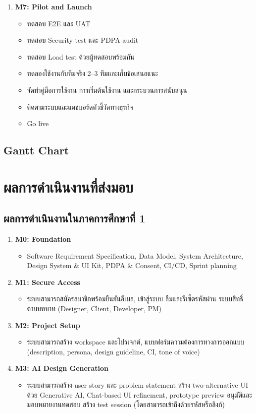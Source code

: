 \begin{enumerate}
  \item \textbf{M7: Pilot and Launch}
    \begin{itemize}
      \item ทดสอบ E2E และ UAT
      \item ทดสอบ Security test และ PDPA audit
      \item ทดสอบ Load test ด้วยผู้ทดสอบพร้อมกัน
      \item ทดลองใช้งานกับทีมจริง 2–3 ทีมและเก็บข้อเสนอแนะ
      \item จัดทำคู่มือการใช้งาน การเริ่มต้นใช้งาน และกระบวนการสนับสนุน
      \item ติดตามระบบและแดชบอร์ดตัวชี้วัดทางธุรกิจ
      \item Go live
    \end{itemize}
\end{enumerate}

\subsection{Gantt Chart}


\section{ผลการดำเนินงานที่ส่งมอบ}
\subsection{ผลการดำเนินงานในภาคการศึกษาที่ 1}
\begin{enumerate}
  \item \textbf{M0: Foundation}
    \begin{itemize}
      \item Software Requirement Specification, Data Model, System Architecture, Design System \& UI Kit, PDPA \& Consent, CI/CD, Sprint planning
    \end{itemize}
  \item \textbf{M1: Secure Access}
    \begin{itemize}
      \item ระบบสามารถสมัครสมาชิกพร้อมยืนยันอีเมล, เข้าสู่ระบบ ลืมและรีเซ็ตรหัสผ่าน ระบบสิทธิ์ตามบทบาท (Designer, Client, Developer, PM)
    \end{itemize}
  \item \textbf{M2: Project Setup}
    \begin{itemize}
      \item ระบบสามารถสร้าง workspace และโปรเจกต์, แบบฟอร์มความต้องการทางการออกแบบ (description, persona, design guideline, CI, tone of voice)
    \end{itemize}
  \item \textbf{M3: AI Design Generation}
    \begin{itemize}
      \item ระบบสามารถสร้าง user story และ problem statement สร้าง two-alternative UI ด้วย Generative AI, Chat-based UI refinement, prototype preview อนุมัติและมอบหมายงานทดสอบ สร้าง test session (โดยสามารถเข้าถึงด้วยรหัสหรือลิงก์)
    \end{itemize}
\end{enumerate}

